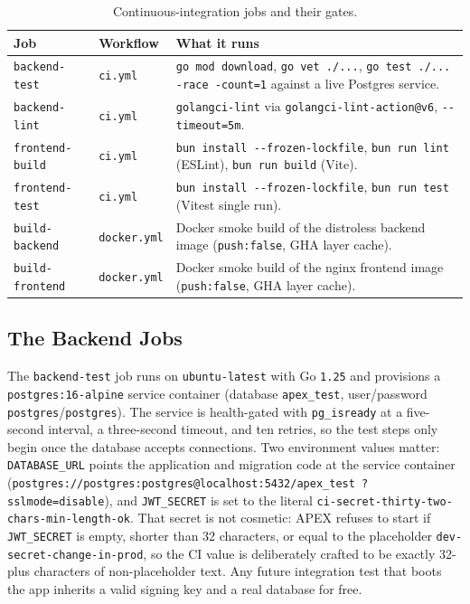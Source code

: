 \begin{table}[htbp]
  \centering
  \caption{Continuous-integration jobs and their gates.}
  \label{tab:cijobs}
  \begin{tabularx}{\linewidth}{@{}L{3.3cm} L{2.6cm} X@{}}
    \toprule
    \textbf{Job} & \textbf{Workflow} & \textbf{What it runs} \\
    \midrule
    \texttt{backend-test} & \texttt{ci.yml} &
      \texttt{go mod download}, \texttt{go vet ./...},
      \texttt{go test ./... -race -count=1} against a live Postgres
      service. \\
    \texttt{backend-lint} & \texttt{ci.yml} &
      \texttt{golangci-lint} via \texttt{golangci-lint-action@v6},
      \texttt{-{}-timeout=5m}. \\
    \texttt{frontend-build} & \texttt{ci.yml} &
      \texttt{bun install -{}-frozen-lockfile}, \texttt{bun run lint}
      (ESLint), \texttt{bun run build} (Vite). \\
    \texttt{frontend-test} & \texttt{ci.yml} &
      \texttt{bun install -{}-frozen-lockfile},
      \texttt{bun run test} (Vitest single run). \\
    \texttt{build-backend} & \texttt{docker.yml} &
      Docker smoke build of the distroless backend image
      (\texttt{push:false}, GHA layer cache). \\
    \texttt{build-frontend} & \texttt{docker.yml} &
      Docker smoke build of the nginx frontend image
      (\texttt{push:false}, GHA layer cache). \\
    \bottomrule
  \end{tabularx}
\end{table}

\subsection{The Backend Jobs}

The \texttt{backend-test} job runs on \texttt{ubuntu-latest} with Go
\texttt{1.25} and provisions a \texttt{postgres:16-alpine} service
container (database \texttt{apex\_test}, user/password
\texttt{postgres}/\texttt{postgres}). The service is health-gated with
\texttt{pg\_isready} at a five-second interval, a three-second timeout,
and ten retries, so the test steps only begin once the database accepts
connections. Two environment values matter: \texttt{DATABASE\_URL}
points the application and migration code at the service container
(\texttt{postgres://postgres:postgres@localhost:5432/apex\_test\allowbreak
?sslmode=disable}), and \texttt{JWT\_SECRET} is set to the literal
\texttt{ci-secret-thirty-two-chars-min-length-ok}. That secret is not
cosmetic: APEX refuses to start if \texttt{JWT\_SECRET} is empty, shorter
than 32 characters, or equal to the placeholder
\texttt{dev-secret-change-in-prod}, so the CI value is deliberately
crafted to be exactly 32-plus characters of non-placeholder text. Any
future integration test that boots the app inherits a valid signing key
and a real database for free.

